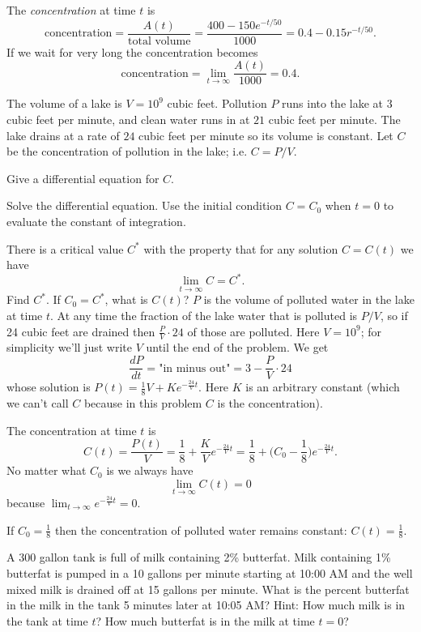 \begin{multicols}{2}
The \emph{concentration} at time $t$ is 
\[
\text{concentration} = \frac{A(t)}{\text{total volume}} = 
\frac{400 - 150e^{-t/50}}{1000} = 0.4 - 0.15 r^{-t/50}.
\]
If we wait for very long the concentration becomes
\[
\text{concentration} = \lim_{t\to\infty} \frac{A(t)}{1000} = 0.4.
\]
\endanswer

 The volume of a lake is $V=10^9$ cubic feet.  Pollution $P$ runs %
into the lake at $3$ cubic feet per minute, and clean water runs in at $21$
cubic feet per minute.  The lake drains at a rate of $24$ cubic feet per
minute so its volume is constant. Let $C$ be the concentration of pollution
in the lake; i.e. $C=P/V$.

\subprob Give a differential equation for $C$.

\subprob Solve the differential equation. Use the initial condition $C=C_0$
when $t=0$ to evaluate the constant of integration.

\subprob There is a critical value $C^*$ with the property that for any
solution $C=C(t)$ we have
\[
\lim_{t\to\infty}C= C^*.
\]
Find $C^*$. If $C_0=C^*$, what is $C(t)$?
\answer %
$P$ is the volume of polluted water in the lake at time $t$.
At any time the fraction of the lake water that is polluted is $P/V$, so if
24 cubic feet are drained then $\frac{P}{V}\cdot24$ of those are polluted.
Here $V=10^9$; for simplicity we'll just write $V$ until the end of the
problem. We get
\[
\frac{dP}{dt} = \text{"in minus out"}
= 3 - \frac{P}{V} \cdot 24
\]
whose solution is $P(t) = \frac{1}{8}V+Ke^{-\frac{24}{V}t}$.  Here
$K$ is an arbitrary constant (which we can't call $C$ because in this
problem $C$ is the concentration).

The concentration at time $t$ is 
\[
C(t) = \frac{P(t)}{V} = \frac18 + \frac{K}{V}e^{-\frac{24}{V}t} 
=\frac18 + \bigl(C_0 - \frac18\bigr) e^{-\frac{24}{V}t} .
\]
No matter what $C_0$ is we always have
\[
\lim_{t\to\infty} C(t) = 0
\]
because $\lim_{t\to\infty} e^{-\frac{24}{V}t} = 0$.

If $C_0 = \frac18$ then the concentration of polluted water remains
constant: $C(t) = \frac18$.
\endanswer

 A 300 gallon tank is full of milk containing 2\% %
butterfat.  Milk containing 1\% butterfat is pumped in a 10 gallons per minute
starting at 10:00 AM and the well mixed milk is drained off at 15 gallons per minute.
What is the percent butterfat in the milk in the tank 5 minutes later at 10:05 AM?
Hint: How much milk is in the tank at time $t$?  How much butterfat is in the milk at
time $t=0$?




\end{multicols}
